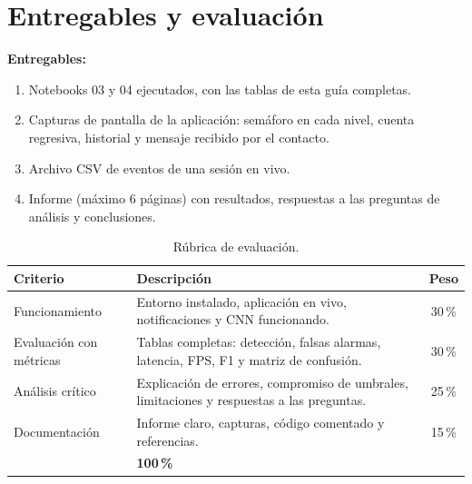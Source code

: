 \documentclass[11pt,a4paper]{article}
\begin{document}
\section{Entregables y evaluación}
\textbf{Entregables:}
\begin{enumerate}
  \item Notebooks 03 y 04 ejecutados, con las tablas de esta guía completas.
  \item Capturas de pantalla de la aplicación: semáforo en cada nivel, cuenta regresiva, historial y mensaje
        recibido por el contacto.
  \item Archivo CSV de eventos de una sesión en vivo.
  \item Informe (máximo 6 páginas) con resultados, respuestas a las preguntas de análisis y conclusiones.
\end{enumerate}

\begin{table}[H]
\centering
\caption{Rúbrica de evaluación.}
\begin{tabularx}{\textwidth}{>{\raggedright}p{3.4cm} X c}
\toprule
\textbf{Criterio} & \textbf{Descripción} & \textbf{Peso}\\
\midrule
Funcionamiento & Entorno instalado, aplicación en vivo, notificaciones y CNN funcionando. & 30\,\%\\
Evaluación con métricas & Tablas completas: detección, falsas alarmas, latencia, FPS, F1 y matriz de confusión. & 30\,\%\\
Análisis crítico & Explicación de errores, compromiso de umbrales, limitaciones y respuestas a las preguntas. & 25\,\%\\
Documentación & Informe claro, capturas, código comentado y referencias. & 15\,\%\\
\midrule
\multicolumn{2}{r}{\textbf{Total}} & \textbf{100\,\%}\\
\bottomrule
\end{tabularx}
\end{table}

\end{document}
